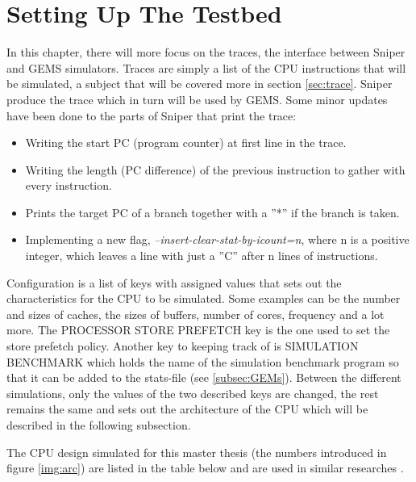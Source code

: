 \chapter{Setting Up The Testbed}
\label{chap:SettingUpTheTestbed} 
 In this chapter, there will more focus on the traces, the interface between Sniper
and GEMS simulators. Traces are simply a list of the CPU instructions that will be
simulated, a subject that will be covered more in section \ref{sec:trace}. Sniper produce the
trace which in turn will be used by GEMS. Some minor updates have been done to
the parts of Sniper that print the trace:

\begin{itemize}
\item Writing the start PC (program counter) at first line in the trace.
\item Writing the length (PC difference) of the previous instruction to gather with every instruction.
\item Prints the target PC of a branch together with a ”*” if the branch is taken.
\item Implementing a new flag,\emph{ –insert-clear-stat-by-icount=n}, where n is a positive
integer, which leaves a line with just a ”C” after n lines of instructions.    
\end{itemize}

Configuration is a list of keys with assigned values that sets out the characteristics
for the CPU to be simulated. Some examples can be the number and sizes of
caches, the sizes of buffers, number of cores, frequency and a lot more. The PROCESSOR
STORE PREFETCH key is the one used to set the store prefetch policy. Another
key to keeping track of is SIMULATION BENCHMARK which holds the name of
the simulation benchmark program so that it can be added to the stats-file (see
\ref{subsec:GEMs}). Between the different simulations, only the values of the two described keys
are changed, the rest remains the same and sets out the architecture of the CPU
which will be described in the following subsection.

\newpage
{}
The CPU design simulated for this master thesis (the numbers introduced in figure
\ref{img:arc}) are listed in the table below and are used in similar researches \cite{thePaper}. 

